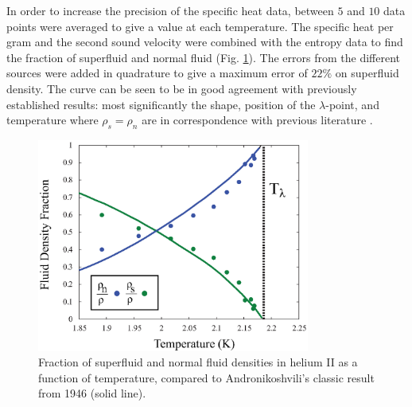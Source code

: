 In order to increase the precision of the specific heat data, between
$5$ and $10$ data points were averaged to give a value at each
temperature. The specific heat per gram and the second sound velocity
were combined with the entropy data to find the fraction of superfluid
and normal fluid (Fig. \ref{fig:density}). The errors from the
different sources were added in quadrature to give a maximum error of
$22\%$ on superfluid density. The curve can be seen to be in good
agreement with previously established results: most significantly the
shape, position of the $\lambda$-point, and temperature where $\rho_s
= \rho_n$ are in correspondence with previous literature \cite{andro}.
\begin{figure}[htbp]
\begin{center}
\includegraphics[height=70mm]{./figures/density.eps}
\caption{\small{Fraction of superfluid and normal fluid densities in
    helium II as a function of temperature, compared to
    Andronikoshvili's classic result from 1946 (solid
    line)\cite{andro}.}}
\label{fig:density}
\end{center}
\end{figure}
